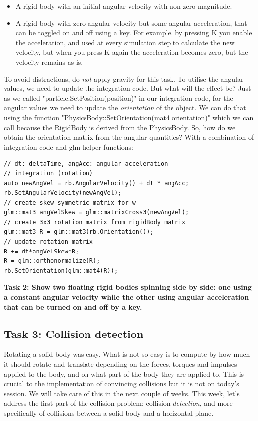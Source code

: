 \documentclass[12pt]{article}
\begin{document}
\begin{itemize}
\item A rigid body with an initial angular velocity with non-zero magnitude.
\item A rigid body with zero angular velocity but some angular acceleration, that can be toggled on and off using a key. For example, by pressing K you enable the acceleration, and used at every simulation step to calculate the new velocity, but when you press K again the acceleration becomes zero, but the velocity remains as-is.
\end{itemize}

To avoid distractions, do \emph{not} apply gravity for this task. To utilise the angular values, we need to update the integration code. But what will the effect be? Just as we called "particle.SetPosition(position)" in our integration code, for the angular values we need to update the \emph{orientation} of the object. We can do that using the function "PhysicsBody::SetOrientation(mat4 orientation)" which we can call because the RigidBody is derived from the PhysicsBody. So, how do we obtain the orientation matrix from the angular quantities? With a combination of integration code and glm helper functions:

\begin{minipage}{\linewidth}\begin{lstlisting}
// dt: deltaTime, angAcc: angular acceleration
// integration (rotation)
auto newAngVel = rb.AngularVelocity() + dt * angAcc;
rb.SetAngularVelocity(newAngVel);
// create skew symmetric matrix for w
glm::mat3 angVelSkew = glm::matrixCross3(newAngVel);
// create 3x3 rotation matrix from rigidBody matrix
glm::mat3 R = glm::mat3(rb.Orientation());
// update rotation matrix
R += dt*angVelSkew*R;
R = glm::orthonormalize(R);
rb.SetOrientation(glm::mat4(R));
\end{lstlisting}\end{minipage}

\textbf{Task 2: Show two floating rigid bodies spinning side by side: one using a constant angular velocity while the other using angular acceleration that can be turned on and off by a key.}

\subsection*{Task 3: Collision detection}

Rotating a solid body was easy. What is not so easy is to compute by how much it should rotate and translate depending on the forces, torques and impulses applied to the body, and on what part of the body they are applied to. This is crucial to the implementation of convincing collisions but it is not on today's session. We will take care of this in the next couple of weeks. This week, let's address the first part of the collision problem: collision \emph{detection}, and more specifically of collisions between a solid body and a horizontal plane. 
\end{document}
